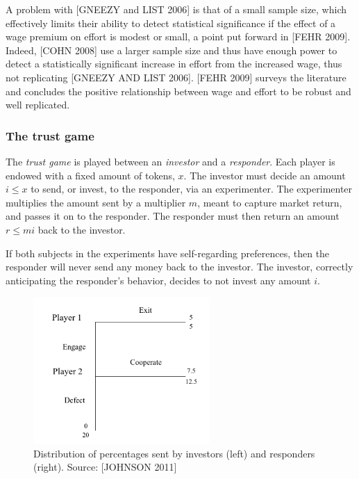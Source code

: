 \message{ !name(tese.tex)}\documentclass{article}
\begin{document}
A problem with [GNEEZY and LIST 2006] is that of a small sample size, which effectively limits their ability to detect statistical significance if the effect of a wage premium on effort is modest or small, a point put forward in [FEHR 2009]. Indeed, [COHN 2008] use a larger sample size and thus have enough power to detect a statistically significant increase in effort from the increased wage, thus not replicating [GNEEZY AND LIST 2006]. [FEHR 2009] surveys the literature and concludes the positive relationship between wage and effort to be robust and well replicated. 



\subsubsection{The trust game}


The \textit{trust game} is played between an \textit{investor} and a \textit{responder}. Each player is endowed with a fixed amount of tokens, $x$. The investor must decide an amount $i \leq x$ to send, or invest, to the responder, via an experimenter. The experimenter multiplies the amount sent by a multiplier $m$, meant to capture market return, and passes it on to the responder. The responder must then return an amount $r \leq mi$ back to the investor. 

If both subjects in the experiments have self-regarding preferences, then the responder will never send any money back to the investor. The investor, correctly anticipating the responder's behavior, decides to not invest any amount $i$.
\\

\begin{figure}[H]
    \centering
    \includegraphics[width=0.6\textwidth]{trustgame.png}
    \caption{Distribution of percentages sent by investors (left) and responders (right). Source: [JOHNSON 2011]}
    \label{fig:trustgame}
\end{figure}
\end{document}
